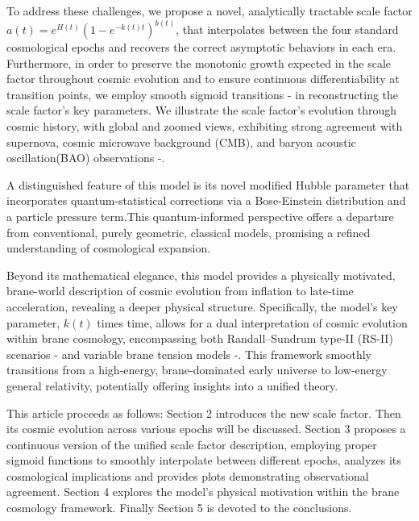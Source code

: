 \documentclass[12pt]{article}  %
\begin{document}
To address these challenges, we propose a novel, analytically tractable scale factor $ a(t)=e^{H(t)} { (1-e^{-k(t)t}) }^{b(t)}$, that interpolates between the four standard cosmological epochs and recovers the correct asymptotic behaviors in each era. Furthermore, in order to preserve the monotonic growth expected in the scale factor throughout cosmic evolution and to ensure continuous differentiability at transition points, we employ smooth sigmoid transitions \cite{28}-\cite{30} in reconstructing the scale factor’s key parameters. We illustrate the scale factor's evolution through cosmic history, with global and zoomed views, exhibiting strong agreement with supernova, cosmic microwave background (CMB), and baryon acoustic oscillation(BAO) observations \cite{31}-\cite{36}. 

A distinguished feature of this model is its novel modified Hubble parameter that incorporates quantum-statistical corrections via a Bose-Einstein distribution and a particle pressure term.This quantum-informed perspective offers a departure from conventional, purely geometric, classical models, promising a refined understanding of cosmological expansion.

Beyond its mathematical elegance, this model provides a physically motivated, brane-world description of cosmic evolution from inflation to late-time acceleration, revealing a deeper physical structure. Specifically, the model's key parameter, $k(t)$ times time, allows for a dual interpretation of cosmic evolution within brane cosmology, encompassing both Randall–Sundrum type-II (RS-II) scenarios \cite{37}-\cite{39} and variable brane tension models \cite{40}-\cite{43}. This framework smoothly transitions from a high-energy, brane-dominated early universe to low-energy general relativity, potentially offering insights into a unified theory.



This article proceeds as follows: Section 2 introduces the new scale factor. Then its cosmic evolution across various epochs will be discussed. Section 3 proposes a continuous version of the unified scale factor description, employing proper sigmoid functions to smoothly interpolate between different epochs, analyzes its cosmological implications and provides plots demonstrating observational agreement.  Section 4 explores the model's physical motivation within the brane cosmology framework. Finally Section 5 is devoted to the conclusions.



\end{document}
